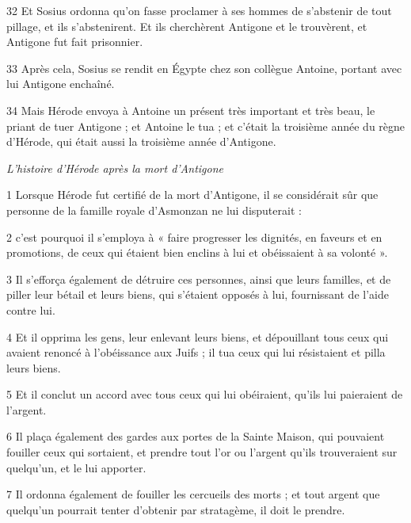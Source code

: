 \par 32 Et Sosius ordonna qu'on fasse proclamer à ses hommes de s'abstenir de tout pillage, et ils s'abstenirent. Et ils cherchèrent Antigone et le trouvèrent, et Antigone fut fait prisonnier.

\par 33 Après cela, Sosius se rendit en Égypte chez son collègue Antoine, portant avec lui Antigone enchaîné.

\par 34 Mais Hérode envoya à Antoine un présent très important et très beau, le priant de tuer Antigone ; et Antoine le tua ; et c'était la troisième année du règne d'Hérode, qui était aussi la troisième année d'Antigone.


\par \textit{L'histoire d'Hérode après la mort d'Antigone}

\par 1 Lorsque Hérode fut certifié de la mort d'Antigone, il se considérait sûr que personne de la famille royale d'Asmonzan ne lui disputerait :

\par 2 c'est pourquoi il s'employa à « faire progresser les dignités, en faveurs et en promotions, de ceux qui étaient bien enclins à lui et obéissaient à sa volonté ».

\par 3 Il s'efforça également de détruire ces personnes, ainsi que leurs familles, et de piller leur bétail et leurs biens, qui s'étaient opposés à lui, fournissant de l'aide contre lui.

\par 4 Et il opprima les gens, leur enlevant leurs biens, et dépouillant tous ceux qui avaient renoncé à l'obéissance aux Juifs ; il tua ceux qui lui résistaient et pilla leurs biens.

\par 5 Et il conclut un accord avec tous ceux qui lui obéiraient, qu'ils lui paieraient de l'argent.

\par 6 Il plaça également des gardes aux portes de la Sainte Maison, qui pouvaient fouiller ceux qui sortaient, et prendre tout l'or ou l'argent qu'ils trouveraient sur quelqu'un, et le lui apporter.

\par 7 Il ordonna également de fouiller les cercueils des morts ; et tout argent que quelqu'un pourrait tenter d'obtenir par stratagème, il doit le prendre.

